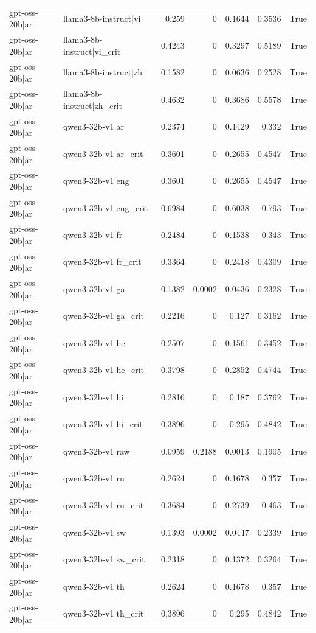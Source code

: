 \begin{table}
\begin{tabular}{l l r r r r l}
gpt-oss-20b|ar & llama3-8b-instruct|vi & 0.259 & 0 & 0.1644 & 0.3536 & True \\
gpt-oss-20b|ar & llama3-8b-instruct|vi_crit & 0.4243 & 0 & 0.3297 & 0.5189 & True \\
gpt-oss-20b|ar & llama3-8b-instruct|zh & 0.1582 & 0 & 0.0636 & 0.2528 & True \\
gpt-oss-20b|ar & llama3-8b-instruct|zh_crit & 0.4632 & 0 & 0.3686 & 0.5578 & True \\
gpt-oss-20b|ar & qwen3-32b-v1|ar & 0.2374 & 0 & 0.1429 & 0.332 & True \\
gpt-oss-20b|ar & qwen3-32b-v1|ar_crit & 0.3601 & 0 & 0.2655 & 0.4547 & True \\
gpt-oss-20b|ar & qwen3-32b-v1|eng & 0.3601 & 0 & 0.2655 & 0.4547 & True \\
gpt-oss-20b|ar & qwen3-32b-v1|eng_crit & 0.6984 & 0 & 0.6038 & 0.793 & True \\
gpt-oss-20b|ar & qwen3-32b-v1|fr & 0.2484 & 0 & 0.1538 & 0.343 & True \\
gpt-oss-20b|ar & qwen3-32b-v1|fr_crit & 0.3364 & 0 & 0.2418 & 0.4309 & True \\
gpt-oss-20b|ar & qwen3-32b-v1|ga & 0.1382 & 0.0002 & 0.0436 & 0.2328 & True \\
gpt-oss-20b|ar & qwen3-32b-v1|ga_crit & 0.2216 & 0 & 0.127 & 0.3162 & True \\
gpt-oss-20b|ar & qwen3-32b-v1|he & 0.2507 & 0 & 0.1561 & 0.3452 & True \\
gpt-oss-20b|ar & qwen3-32b-v1|he_crit & 0.3798 & 0 & 0.2852 & 0.4744 & True \\
gpt-oss-20b|ar & qwen3-32b-v1|hi & 0.2816 & 0 & 0.187 & 0.3762 & True \\
gpt-oss-20b|ar & qwen3-32b-v1|hi_crit & 0.3896 & 0 & 0.295 & 0.4842 & True \\
gpt-oss-20b|ar & qwen3-32b-v1|raw & 0.0959 & 0.2188 & 0.0013 & 0.1905 & True \\
gpt-oss-20b|ar & qwen3-32b-v1|ru & 0.2624 & 0 & 0.1678 & 0.357 & True \\
gpt-oss-20b|ar & qwen3-32b-v1|ru_crit & 0.3684 & 0 & 0.2739 & 0.463 & True \\
gpt-oss-20b|ar & qwen3-32b-v1|sw & 0.1393 & 0.0002 & 0.0447 & 0.2339 & True \\
gpt-oss-20b|ar & qwen3-32b-v1|sw_crit & 0.2318 & 0 & 0.1372 & 0.3264 & True \\
gpt-oss-20b|ar & qwen3-32b-v1|th & 0.2624 & 0 & 0.1678 & 0.357 & True \\
gpt-oss-20b|ar & qwen3-32b-v1|th_crit & 0.3896 & 0 & 0.295 & 0.4842 & True \\

\end{tabular}
\end{table}
